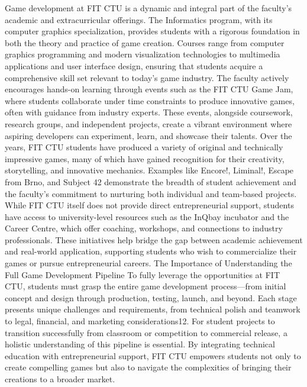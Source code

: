 Game development at FIT CTU is a dynamic and integral part of the faculty’s academic and extracurricular offerings. The Informatics program, with its computer graphics specialization, provides students with a rigorous foundation in both the theory and practice of game creation. Courses range from computer graphics programming and modern visualization technologies to multimedia applications and user interface design, ensuring that students acquire a comprehensive skill set relevant to today’s game industry.
The faculty actively encourages hands-on learning through events such as the FIT CTU Game Jam, where students collaborate under time constraints to produce innovative games, often with guidance from industry experts. These events, alongside coursework, research groups, and independent projects, create a vibrant environment where aspiring developers can experiment, learn, and showcase their talents.
Over the years, FIT CTU students have produced a variety of original and technically impressive games, many of which have gained recognition for their creativity, storytelling, and innovative mechanics. Examples like Encore!, Liminal!, Escape from Brno, and Subject 42 demonstrate the breadth of student achievement and the faculty’s commitment to nurturing both individual and team-based projects.
While FIT CTU itself does not provide direct entrepreneurial support, students have access to university-level resources such as the InQbay incubator and the Career Centre, which offer coaching, workshops, and connections to industry professionals. These initiatives help bridge the gap between academic achievement and real-world application, supporting students who wish to commercialize their games or pursue entrepreneurial careers.
The Importance of Understanding the Full Game Development Pipeline
To fully leverage the opportunities at FIT CTU, students must grasp the entire game development process—from initial concept and design through production, testing, launch, and beyond. Each stage presents unique challenges and requirements, from technical polish and teamwork to legal, financial, and marketing considerations12. For student projects to transition successfully from classroom or competition to commercial release, a holistic understanding of this pipeline is essential. By integrating technical education with entrepreneurial support, FIT CTU empowers students not only to create compelling games but also to navigate the complexities of bringing their creations to a broader market.

